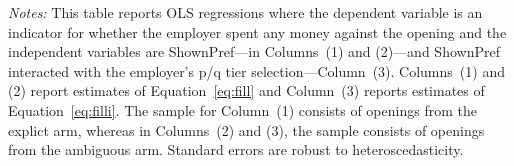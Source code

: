 \begin{table}[!htbp]
{}
\centering
\begin{minipage}{1\linewidth} 
 \emph{Notes:} This table reports OLS regressions where the dependent variable is an indicator for whether the employer spent any money against the opening and the independent variables are ShownPref---in Columns~(1) and (2)---and ShownPref interacted with the employer's p/q tier selection---Column~(3).
Columns~(1) and (2) report estimates of Equation~\ref{eq:fill} and Column~(3) reports estimates of Equation~\ref{eq:filli}. 
\shownprefdef
\tierdef
The sample for Column~(1) consists of openings from the explict arm, whereas in Columns~(2) and (3), the sample consists of openings from the ambiguous arm.
\ambigdef \explicitdef Standard errors are robust to heteroscedasticity.  \starlanguage
 \end{minipage}
\end{table}
